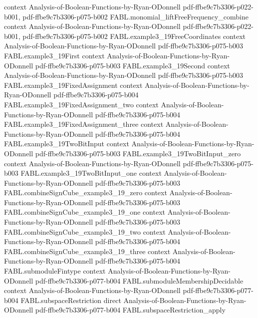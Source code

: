 \begin{theorem}
  {context}
  {Analysis-of-Boolean-Functions-by-Ryan-ODonnell}
  {pdf-ffbe9c7b3306-p022-b001,
    pdf-ffbe9c7b3306-p075-b002}
\proofstep
  {FABL.monomial_liftFreeFrequency_combine}
  {context}
  {Analysis-of-Boolean-Functions-by-Ryan-ODonnell}
  {pdf-ffbe9c7b3306-p022-b001,
    pdf-ffbe9c7b3306-p075-b002}
\proofstep
  {FABL.example3_19FreeCoordinates}
  {context}
  {Analysis-of-Boolean-Functions-by-Ryan-ODonnell}
  {pdf-ffbe9c7b3306-p075-b003}
\proofstep
  {FABL.example3_19First}
  {context}
  {Analysis-of-Boolean-Functions-by-Ryan-ODonnell}
  {pdf-ffbe9c7b3306-p075-b003}
\proofstep
  {FABL.example3_19Second}
  {context}
  {Analysis-of-Boolean-Functions-by-Ryan-ODonnell}
  {pdf-ffbe9c7b3306-p075-b003}
\proofstep
  {FABL.example3_19FixedAssignment}
  {context}
  {Analysis-of-Boolean-Functions-by-Ryan-ODonnell}
  {pdf-ffbe9c7b3306-p075-b004}
\proofstep
  {FABL.example3_19FixedAssignment_two}
  {context}
  {Analysis-of-Boolean-Functions-by-Ryan-ODonnell}
  {pdf-ffbe9c7b3306-p075-b004}
\proofstep
  {FABL.example3_19FixedAssignment_three}
  {context}
  {Analysis-of-Boolean-Functions-by-Ryan-ODonnell}
  {pdf-ffbe9c7b3306-p075-b004}
\proofstep
  {FABL.example3_19TwoBitInput}
  {context}
  {Analysis-of-Boolean-Functions-by-Ryan-ODonnell}
  {pdf-ffbe9c7b3306-p075-b003}
\proofstep
  {FABL.example3_19TwoBitInput_zero}
  {context}
  {Analysis-of-Boolean-Functions-by-Ryan-ODonnell}
  {pdf-ffbe9c7b3306-p075-b003}
\proofstep
  {FABL.example3_19TwoBitInput_one}
  {context}
  {Analysis-of-Boolean-Functions-by-Ryan-ODonnell}
  {pdf-ffbe9c7b3306-p075-b003}
\proofstep
  {FABL.combineSignCube_example3_19_zero}
  {context}
  {Analysis-of-Boolean-Functions-by-Ryan-ODonnell}
  {pdf-ffbe9c7b3306-p075-b003}
\proofstep
  {FABL.combineSignCube_example3_19_one}
  {context}
  {Analysis-of-Boolean-Functions-by-Ryan-ODonnell}
  {pdf-ffbe9c7b3306-p075-b003}
\proofstep
  {FABL.combineSignCube_example3_19_two}
  {context}
  {Analysis-of-Boolean-Functions-by-Ryan-ODonnell}
  {pdf-ffbe9c7b3306-p075-b004}
\proofstep
  {FABL.combineSignCube_example3_19_three}
  {context}
  {Analysis-of-Boolean-Functions-by-Ryan-ODonnell}
  {pdf-ffbe9c7b3306-p075-b004}
\proofstep
  {FABL.submoduleFintype}
  {context}
  {Analysis-of-Boolean-Functions-by-Ryan-ODonnell}
  {pdf-ffbe9c7b3306-p077-b004}
\proofstep
  {FABL.submoduleMembershipDecidable}
  {context}
  {Analysis-of-Boolean-Functions-by-Ryan-ODonnell}
  {pdf-ffbe9c7b3306-p077-b004}
\proofstep
  {FABL.subspaceRestriction}
  {direct}
  {Analysis-of-Boolean-Functions-by-Ryan-ODonnell}
  {pdf-ffbe9c7b3306-p077-b004}
\proofstep
  {FABL.subspaceRestriction_apply}

\end{theorem}
